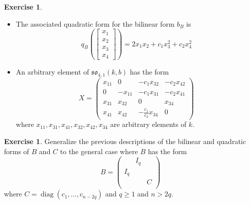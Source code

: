 \documentclass[12pt]{article}
\theoremstyle{definition}
\newtheorem{exercise}[theorem]{Exercise}
\newcommand{\lp}{\left(}
\newcommand{\rp}{\right)}
\DeclareMathOperator{\diag}{diag}
\begin{document}
\begin{exercise}
\begin{itemize}
\[		\rp
		= c_1 x_1^2 + c_2 x_2^2
	\]
	\item The associated quadratic form for the bilinear form $b_B$ is
	\[
		q_B \lp
		\begin{bmatrix}
			x_1 \\
			x_2 \\
			x_3 \\
			x_4
		\end{bmatrix}
		\rp
		= 2x_1 x_2 + c_1 x_3^2 + c_2 x_4^2
	\]
	\item An arbitrary element of $\mathfrak{so}_{4,1}(k,b)$ has the form
\[
	X = \begin{pmatrix}
		x_{11} & 0 & -c_1 x_{32}  & -c_2 x_{42} \\
		0 & -x_{11} & -c_1 x_{31} & -c_2 x_{41} \\
		x_{31} & x_{32} & 0 & x_{34} \\
		x_{41} & x_{42} & - \frac{c_1}{c_2} x_{34} & 0
	\end{pmatrix}
\]
where $x_{11}, x_{31}, x_{41}, x_{32}, x_{42}, x_{34}$ are arbitrary elements of $k$.
\end{itemize}
\end{exercise}

\begin{exercise}
Generalize the previous descriptions of the bilinear and quadratic forms of $B$ and $C$ to the general case where $B$ has the form
\[
	B = 
	\begin{pmatrix}
		& I_q \\
		I_q \\
		&& C  \\
	\end{pmatrix}
\]
where $C = \diag(c_1, \ldots, c_{n-2q})$ and $q \ge 1$ and $n > 2q$.
\end{exercise}
\end{document}
